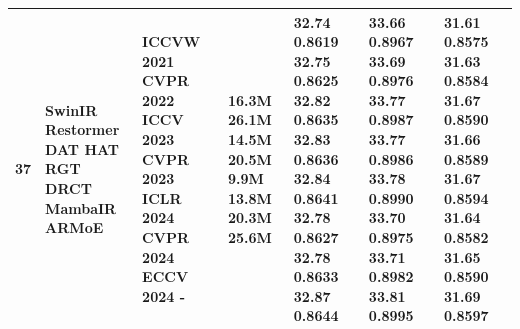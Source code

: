 \begin{tabular}{lllllll}
\toprule
37 & SwinIR Restormer DAT HAT RGT DRCT MambaIR ARMoE & ICCVW 2021 CVPR 2022 ICCV 2023 CVPR 2023 ICLR 2024 CVPR 2024 ECCV 2024 - & 16.3M 26.1M 14.5M 20.5M 9.9M 13.8M 20.3M 25.6M & 32.74 0.8619 32.75 0.8625 32.82 0.8635 32.83 0.8636 32.84 0.8641 32.78 0.8627 32.78 0.8633 32.87 0.8644 & 33.66 0.8967 33.69 0.8976 33.77 0.8987 33.77 0.8986 33.78 0.8990 33.70 0.8975 33.71 0.8982 33.81 0.8995 & 31.61 0.8575 31.63 0.8584 31.67 0.8590 31.66 0.8589 31.67 0.8594 31.64 0.8582 31.65 0.8590 31.69 0.8597 \\
\midrule
\bottomrule
\end{tabular}

